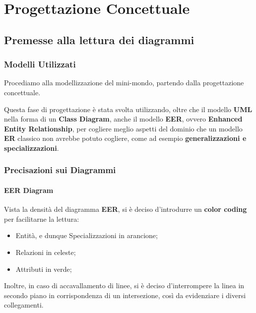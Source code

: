 \chapter{Progettazione Concettuale}

\section{Premesse alla lettura dei diagrammi}

\subsection{Modelli Utilizzati}

Procediamo alla modellizzazione del mini-mondo, partendo dalla progettazione concettuale.

Questa fase di progettazione è stata svolta utilizzando, oltre che il modello \textbf{UML} nella forma di un \textbf{Class Diagram}, anche il modello \textbf{EER}, ovvero \textbf{Enhanced Entity Relationship}, per cogliere meglio aspetti del dominio che un modello \textbf{ER} classico non avrebbe potuto cogliere, come ad esempio \textbf{generalizzazioni e specializzazioni}.

\subsection{Precisazioni sui Diagrammi}

\subsubsection{EER Diagram}

Vista la densità del diagramma \textbf{EER}, si è deciso d'introdurre un \textbf{color coding} per facilitarne la lettura:

\begin{itemize}
  \item \textcolor{PRIMARY}{Entità}, e dunque Specializzazioni in \textcolor{PRIMARY}{arancione};
  \item \textcolor{CONTRAST}{Relazioni} in \textcolor{CONTRAST}{celeste};
  \item \textcolor{NEWGREEN}{Attributi} in \textcolor{NEWGREEN}{verde};
\end{itemize}

Inoltre, in caso di accavallamento di linee, si è deciso d'interrompere la linea in secondo piano in corrispondenza di un intersezione, così da evidenziare i diversi collegamenti.

